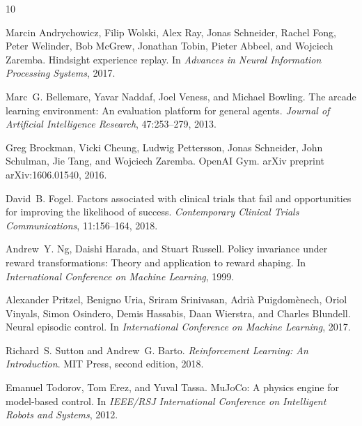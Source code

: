 \documentclass{article}
\begin{document}
\begin{thebibliography}{10}

Marcin Andrychowicz, Filip Wolski, Alex Ray, Jonas Schneider, Rachel Fong,
Peter Welinder, Bob McGrew, Jonathan Tobin, Pieter Abbeel, and Wojciech Zaremba.
Hindsight experience replay.
In \emph{Advances in Neural Information Processing Systems}, 2017.

Marc~G. Bellemare, Yavar Naddaf, Joel Veness, and Michael Bowling.
The arcade learning environment: An evaluation platform for general agents.
\emph{Journal of Artificial Intelligence Research}, 47:253--279, 2013.

Greg Brockman, Vicki Cheung, Ludwig Pettersson, Jonas Schneider, John Schulman,
Jie Tang, and Wojciech Zaremba.
OpenAI Gym.
arXiv preprint arXiv:1606.01540, 2016.

David~B. Fogel.
Factors associated with clinical trials that fail and opportunities for improving the likelihood of success.
\emph{Contemporary Clinical Trials Communications}, 11:156--164, 2018.

Andrew~Y. Ng, Daishi Harada, and Stuart Russell.
Policy invariance under reward transformations: Theory and application to reward shaping.
In \emph{International Conference on Machine Learning}, 1999.

Alexander Pritzel, Benigno Uria, Sriram Srinivasan, Adri\`a Puigdom\`enech,
Oriol Vinyals, Simon Osindero, Demis Hassabis, Daan Wierstra, and Charles Blundell.
Neural episodic control.
In \emph{International Conference on Machine Learning}, 2017.

Richard~S. Sutton and Andrew~G. Barto.
\emph{Reinforcement Learning: An Introduction}.
MIT Press, second edition, 2018.

Emanuel Todorov, Tom Erez, and Yuval Tassa.
MuJoCo: A physics engine for model-based control.
In \emph{IEEE/RSJ International Conference on Intelligent Robots and Systems}, 2012.

\end{thebibliography}
\end{document}

